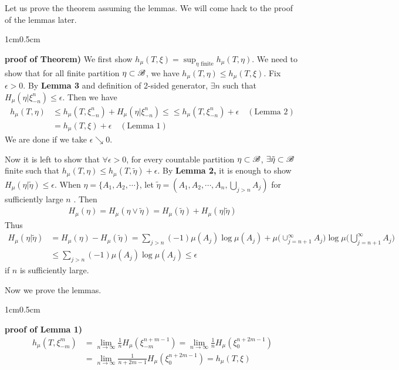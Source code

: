 \documentclass[12pt,a4paper]{report}
\newenvironment{proof}
{\begin{changemargin}{1cm}{0.5cm} 
	}%
	{\end{changemargin}
}
\begin{document}
Let us prove the theorem assuming the lemmas. We will come hack to the proof of the lemmas later.
\s

\begin{proof}
\textbf{proof of Theorem)} We first show $h_{\mu} (T,\xi) = \sup_{\eta \text{ finite}} h_{\mu} (T,\eta)$. We need to show that for all finite partition $\eta \subset \mathscr{B}$, we have $h_{\mu}(T,\eta) \leq h_{\mu}(T,\xi)$. Fix $\epsilon>0$. By \textbf{Lemma 3} and definition of 2-sided generator, $\exists n$ such that $H_{\mu}(\eta | \xi^n_{-n}) \leq \epsilon$. Then we have
\begin{align*}
h_{\mu}(T,\eta) & \leq h_{\mu}(T,\xi_{-n}^n) + H_{\mu}(\eta | \xi^n_{-n}) \leq \leq h_{\mu}(T,\xi_{-n}^n) + \epsilon \quad (\text{Lemma 2}) \\
& = h_{\mu} (T,\xi) + \epsilon \quad (\text{Lemma 1})
\end{align*}
We are done if we take $\epsilon \searrow 0$.
\s

Now it is left to show that $\forall \epsilon >0$, for every countable partition $\eta \subset \mathscr{B}$, $\exists \tilde{\eta} \subset \mathscr{B}$ finite such that $h_{\mu}(T,\eta) \leq h_{\mu}(T, \tilde{\eta}) + \epsilon$. By \textbf{Lemma 2,} it is enough to show $H_{\mu}(\eta |\tilde{\eta}) \leq \epsilon$. When $\eta = \{A_1, A_2, \cdots \}$, let $\tilde{\eta} = (A_1, A_2, \cdots, A_n, \bigcup_{j>n} A_j)$ for sufficiently large $n$ . Then
\begin{align*}
H_{\mu}(\eta) = H_{\mu} (\eta \vee \tilde{\eta}) = H_{\mu}(\tilde{\eta}) + H_{\mu}(\eta |\tilde{\eta})
\end{align*}
Thus
\begin{align*}
H_{\mu}(\eta | \tilde{\eta}) &= H_{\mu}(\eta) - H_{\mu}(\tilde{\eta}) = \sum_{j>n} (-1) \mu(A_j) \log \mu(A_j) + \mu \Big( \cup_{j=n+1}^{\infty} A_j \Big) \log \mu \Big( \bigcup_{j=n+1}^{\infty} A_j \Big) \\
& \leq \sum_{j>n} (-1) \mu(A_j) \log \mu(A_j) \leq \epsilon
\end{align*}
if $n$ is sufficiently large.

\eop
\end{proof}
\s

Now we prove the lemmas.
\s

\begin{proof}
\textbf{proof of Lemma 1)} \begin{align*}
h_{\mu}(T, \xi_{-m}^m) &= \lim_{n\rightarrow \infty} \frac{1}{n} H_{\mu}(\xi^{n+m-1}_{-m}) = \lim_{n\rightarrow \infty} \frac{1}{n} H_{\mu} (\xi_0^{n+2m -1}) \\
&= \lim_{n\rightarrow \infty} \frac{1}{n+2m-1} H_{\mu}(\xi_0^{n+2m-1}) = h_{\mu}(T,\xi)
\end{align*}

\eop
\end{proof}
\s
\end{document}

